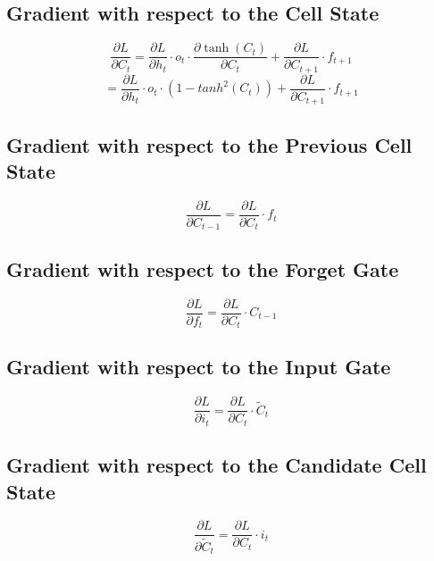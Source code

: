 \documentclass{article}
\begin{document}
\subsection{Gradient with respect to the Cell State}
\begin{equation}
	\frac{\partial L}{\partial C_t} = \frac{\partial L}{\partial h_t} \cdot o_t \cdot \frac{\partial \tanh(C_t)}{\partial C_t} + \frac{\partial L}{\partial C_{t+1}} \cdot f_{t+1}
\end{equation}
\begin{equation}
	= \frac{\partial L}{\partial h_t} \cdot o_t \cdot (1 - tanh^2 (C_t)) + \frac{\partial L}{\partial C_{t+1}} \cdot f_{t+1}
\end{equation}

\subsection{Gradient with respect to the Previous Cell State}
\begin{equation}
	\frac{\partial L}{\partial C_{t-1}} = \frac{\partial L}{\partial C_t} \cdot f_t 
\end{equation}



\subsection{Gradient with respect to the Forget Gate}
\begin{equation}
	\frac{\partial L}{\partial f_t} = \frac{\partial L}{\partial C_t} \cdot C_{t-1}
\end{equation}

\subsection{Gradient with respect to the Input Gate}
\begin{equation}
	\frac{\partial L}{\partial i_t} = \frac{\partial L}{\partial C_t} \cdot \tilde{C}_t
\end{equation}

\subsection{Gradient with respect to the Candidate Cell State}
\begin{equation}
	\frac{\partial L}{\partial \tilde{C}_t} = \frac{\partial L}{\partial C_t} \cdot i_t
\end{equation}
\end{document}
